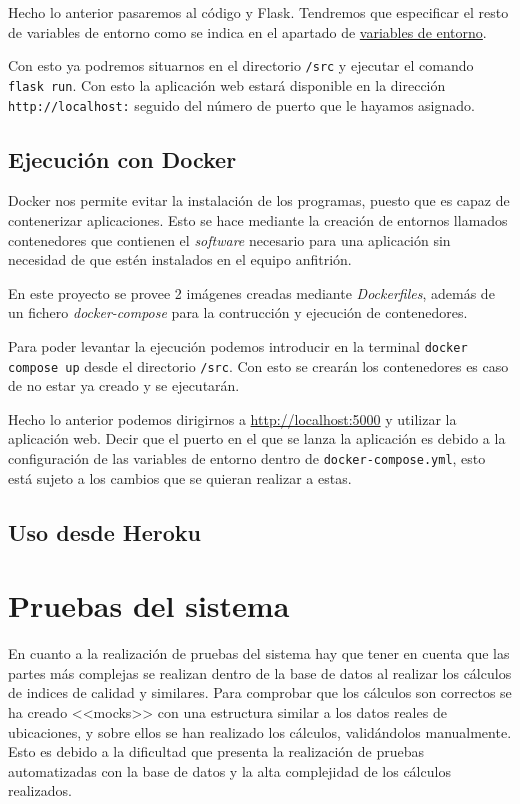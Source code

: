 Hecho lo anterior pasaremos al código y Flask. Tendremos que especificar el resto de variables de entorno como se indica en el apartado de \hyperref[sec:venv]{variables de entorno}.

Con esto ya podremos situarnos en el directorio \texttt{/src} y ejecutar el comando \texttt{flask run}. Con esto la aplicación web estará disponible en la dirección \texttt{http://localhost:} seguido del número de puerto que le hayamos asignado.
\subsection{Ejecución con Docker}
Docker nos permite evitar la instalación de los programas, puesto que es capaz de contenerizar aplicaciones. Esto se hace mediante la creación de entornos llamados contenedores que contienen el \textit{software} necesario para una aplicación sin necesidad de que estén instalados en el equipo anfitrión.

En este proyecto se provee 2 imágenes creadas mediante \textit{Dockerfiles}, además de un fichero \textit{docker-compose} para la contrucción y ejecución de contenedores.

Para poder levantar la ejecución podemos introducir en la terminal \texttt{docker compose up} desde el directorio \texttt{/src}. Con esto se crearán los contenedores es caso de no estar ya creado y se ejecutarán.

Hecho lo anterior podemos dirigirnos a \url{http://localhost:5000} y utilizar la aplicación web. Decir que el puerto en el que se lanza la aplicación es debido a la configuración de las variables de entorno dentro de \texttt{docker-compose.yml}, esto está sujeto a los cambios que se quieran realizar a estas.


\subsection{Uso desde Heroku}

\section{Pruebas del sistema}

En cuanto a la realización de pruebas del sistema hay que tener en cuenta que las partes más complejas se realizan dentro de la base de datos al realizar los cálculos de indices de calidad y similares. Para comprobar que los cálculos son correctos se ha creado <<mocks>> con una estructura similar a los datos reales de ubicaciones, y sobre ellos se han realizado los cálculos, validándolos manualmente. Esto es debido a la dificultad que presenta la realización de pruebas automatizadas con la base de datos y la alta complejidad de los cálculos realizados.
